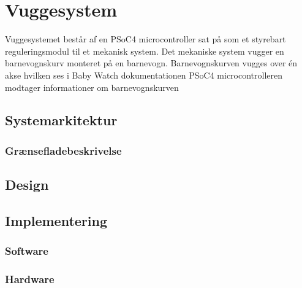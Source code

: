 \chapter{Vuggesystem}
Vuggesystemet består af en PSoC4 microcontroller sat på som et styrebart reguleringsmodul til et mekanisk system. Det mekaniske system vugger en barnevognskurv monteret på en barnevogn. Barnevognskurven vugges over én akse hvilken ses i Baby Watch dokumentationen  PSoC4 microcontrolleren modtager informationer om barnevognskurven 







\section{Systemarkitektur}
\label{vs_sysark}


\subsection{Grænsefladebeskrivelse}


\section{Design}
\label{vs_design}




\section{Implementering}
\label{vs_implementering}



\subsection*{Software}
\label{vs_implementering_sw}


\subsection*{Hardware}
\label{vs_implementering_sw}
